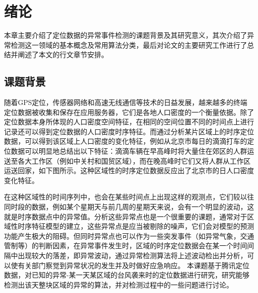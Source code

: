 \documentclass[a4paper,AutoFakeBold,oneside,12pt]{book}
\begin{document}
  
\newpage

  
\newpage

  
\newpage

 
\newpage

\frontmatter\tableofcontents %

\newpage\mainmatter
{} %
\pagestyle{fancy} %


\chapter{绪论}


本章主要介绍了定位数据的异常事件检测的课题背景及其研究意义，其次介绍了异常检测这一领域的基本概念及常用算法分类，最后对论文的主要研究工作进行了总结并阐述了本文的行文章节安排。

\section{课题背景}

随着GPS定位，传感器网络和高速无线通信等技术的日益发展，越来越多的终端定位数据被收集和保存在应用服务器，它们是各地人口密度的一个衡量依据。除了定位数据本身所体现的人口密度空间特征，在相同的空间位置不同的时间点上进行记录还可以得到定位数据的人口密度时序特征。而通过分析某片区域上的时序定位数据，可以得到该区域上人口密度的变化特征，例如从北京市每日的滴滴打车的定位数据可以明显地总结出以下特征：滴滴车辆在早高峰时将大量住在郊区的人群运送至各大工作区（例如中关村和国贸区域），而在晚高峰时它们又将人群从工作区运送回家，如下图所示。这种区域性的时序定位数据反应出了北京市的日人口密度变化特征。

	在这种区域性的时间序列中，也会在某些时间点上出现这样的观测点，它们较以往同时段的数据，例如某个星期天与前几周的星期天来说，会有一个明显的波动，这就是时序数据点中的异常值。分析这些异常点也是一个很重要的课题，通常对于区域性时序特征模型的建立，这些异常点是应当被剔除的噪声，它们会对模型的预测功能产生极大的阻碍。但同时异常点也可以作为一些突发事件（如异常气象，交通管制等）的判断因素，在异常事件发生时，区域的时序定位数据会在某一个时间间隔中出现较大的落差，即异常波动，通过异常检测算法将上述波动检出并分析，可以使有关部门察觉到异常状况的发生并及时做好应急响应。
	本课题基于腾讯定位数据，对已知的异常-某一天某区域的台风袭来时的定位数据进行研究，研究能够检测出该天整块区域的异常的算法，并对检测过程中的一些问题进行讨论。
\end{document}
